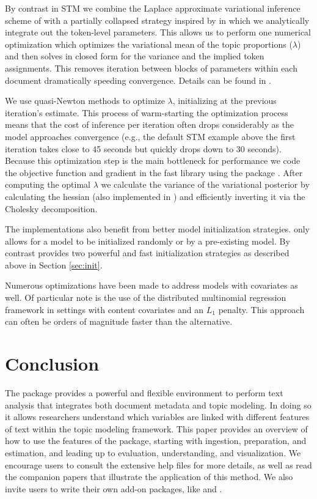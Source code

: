 \documentclass[article,shortnames]{jss}
\begin{document}
By contrast in STM we combine the Laplace approximate variational inference scheme of \cite{wang2013variational} with a partially collapsed strategy inspired by \cite{khan2009variational} in which we analytically integrate out the token-level parameters. This allows us to perform one numerical optimization which optimizes the variational mean of the topic proportions ($\lambda$) and then solves in closed form for the variance and the implied token assignments.  This removes iteration between blocks of parameters within each document dramatically speeding convergence.  Details can be found in \cite{stmjasa}.

We use quasi-Newton methods to optimize $\lambda$, initializing at the previous iteration's estimate.  This process of warm-starting the optimization process means that the cost of inference per iteration often drops considerably as the model approaches convergence (e.g., the default STM example above the first iteration takes close to 45 seconds but quickly drops down to 30 seconds).    Because this optimization step is the main bottleneck for performance we code the objective function and gradient in the fast  library  using the  package \citep{RcppArmadillo}.  After computing the optimal $\lambda$ we calculate the variance of the variational posterior by calculating the hessian (also implemented in ) and efficiently inverting it via the Cholesky decomposition.

The  implementations also benefit from better model initialization strategies.   only allows for a model to be initialized randomly or by a pre-existing model.  By contrast  provides two powerful and fast initialization strategies as described above in Section \ref{sec:init}.

Numerous optimizations have been made to address models with covariates as well.  Of particular note is the use of the distributed multinomial regression framework \citep{taddy2013distributed} in settings with content covariates and an $L_1$ penalty.  This approach can often be orders of magnitude faster than the alternative.

\section{Conclusion}
\label{sec:conclusion}

The   package provides a powerful and flexible environment to perform text analysis that integrates both document metadata and topic modeling. In doing so it allows researchers understand which variables are linked with different features of text within the topic modeling framework. This paper provides an overview of how to use the features of the  package, starting with ingestion, preparation, and estimation, and leading up to evaluation, understanding, and visualization. We encourage users to consult the extensive help files for more details, as well as read the companion papers that illustrate the application of this method. We also invite users to write their own add-on packages, like  and .
\end{document}
